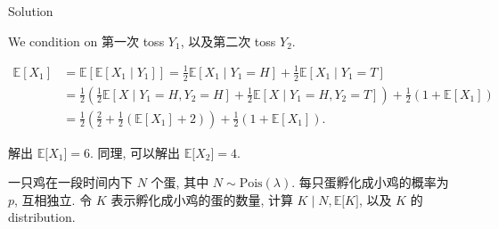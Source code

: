 \begin{qlsolution}{Solution}

We condition on 第一次 toss \(\mathit{Y}_{1}\), 以及第二次 toss \(\mathit{Y}_{2}\).

\[\begin{matrix}
{\mathbb{E}\left\lbrack \mathit{X}_{1} \right\rbrack} & {= \mathbb{E}\left\lbrack {\mathbb{E}\left\lbrack {\mathit{X}_{1} \mid \mathit{Y}_{1}} \right\rbrack} \right\rbrack = \frac{1}{2}\mathbb{E}\left\lbrack {\mathit{X}_{1} \mid \mathit{Y}_{1} = \mathit{H}} \right\rbrack + \frac{1}{2}\mathbb{E}\left\lbrack {\mathit{X}_{1} \mid \mathit{Y}_{1} = \mathit{T}} \right\rbrack} \\
 & {= \frac{1}{2}\left( {\frac{1}{2}\mathbb{E}\left\lbrack {\mathit{X} \mid \mathit{Y}_{1} = \mathit{H},\mathit{Y}_{2} = \mathit{H}} \right\rbrack + \frac{1}{2}\mathbb{E}\left\lbrack {\mathit{X} \mid \mathit{Y}_{1} = \mathit{H},\mathit{Y}_{2} = \mathit{T}} \right\rbrack} \right) + \frac{1}{2}\left( {1 + \mathbb{E}\left\lbrack \mathit{X}_{1} \right\rbrack} \right)} \\
 & {= \frac{1}{2}\left( {\frac{2}{2} + \frac{1}{2}\left( {\mathbb{E}\left\lbrack \mathit{X}_{1} \right\rbrack + 2} \right)} \right) + \frac{1}{2}\left( {1 + \mathbb{E}\left\lbrack \mathit{X}_{1} \right\rbrack} \right).}
\end{matrix}\]

解出 \(\mathbb{E}\lbrack\mathit{X}_{1}\rbrack = 6\). 同理, 可以解出 \(\mathbb{E}\lbrack\mathit{X}_{2}\rbrack = 4\).

\end{qlsolution}

\begin{example}

一只鸡在一段时间内下 \(\mathit{N}\) 个蛋, 其中 \(\mathit{N} \sim \text{Pois}(\mathit{\lambda})\). 每只蛋孵化成小鸡的概率为 \(\mathit{p}\), 互相独立. 令 \(\mathit{K}\) 表示孵化成小鸡的蛋的数量, 计算 \(\left. \mathit{K} \middle| \mathit{N},\mathbb{E}\lbrack\mathit{K}\rbrack \right.\), 以及 \(\mathit{K}\) 的 distribution.

\end{example}


